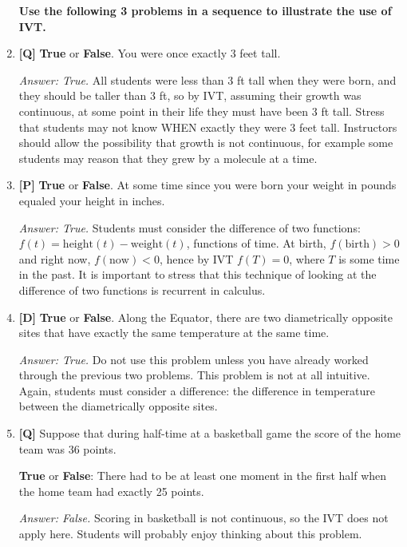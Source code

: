 \documentclass[12pt]{article}
\begin{document}
\begin{enumerate}
\bigskip

{\bf Use the following 3 problems in a sequence to illustrate the use of IVT.} 

\item {\bf [Q]} \textbf{True} or \textbf{False}. You were once exactly 3 feet tall. 

{\it Answer: True.} All students were less than 3 ft tall when they were born, and they should be taller than 3 ft, so by IVT, assuming their growth was continuous, at some point in their life they must have been 3 ft tall.
Stress that students may not know WHEN exactly they were 3 feet tall. Instructors should allow the possibility that growth is not continuous, for example some students may reason that they grew by a molecule at a time.

\bigskip

\item {\bf [P]} \textbf{True} or \textbf{False}. At some time since you were
born your weight in pounds equaled your height in inches. 

{\it Answer: True.} Students must consider the difference of two functions: 
$f(t)=\mbox{height}(t)-\mbox{weight}(t)$, functions of time. At birth, 
$f(\mbox{birth})>0$ and right now, $f(\mbox{now})<0$, hence by IVT $f(T)=0$, where $T$ is some time in the past.
It is important to stress that this technique of looking at the difference of two functions is recurrent in calculus.

\bigskip

\item {\bf [D]} \textbf{True} or \textbf{False}. Along the Equator, there are two diametrically opposite sites that have exactly the same temperature at the same time.

{\it Answer: True.} Do not use this problem unless you have already worked through the previous two problems. This problem is not at all intuitive. Again, students must consider a difference: the difference in temperature between the diametrically opposite sites.

\bigskip

\item {\bf [Q]} Suppose that during half-time at a basketball game the
score of the home team was 36 points.

\textbf{True} or \textbf{False}: There had to be at least one
moment in the first half when the home team had exactly 25 points.

{\it Answer: False.} Scoring in basketball is not continuous, so the
IVT does not apply here.  Students will probably enjoy thinking about this
problem.


\end{enumerate}
\end{document}
